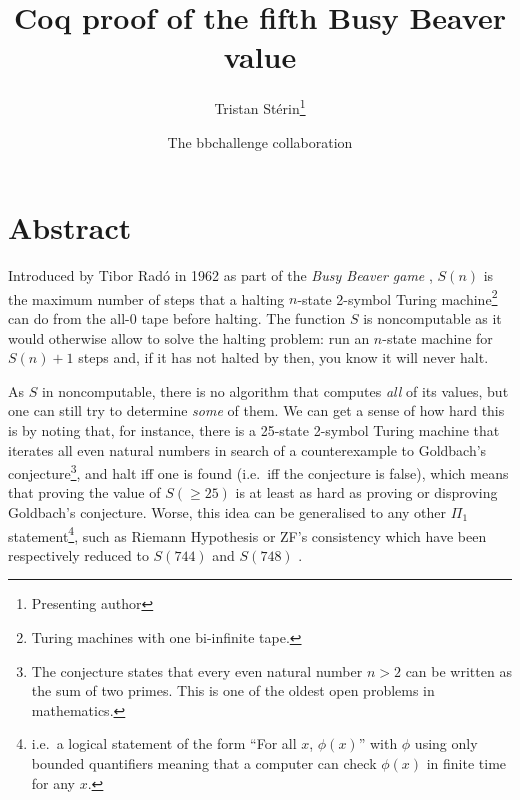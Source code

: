 \documentclass{easychair}
\title{Coq proof of the fifth Busy Beaver value}
\author{
  Tristan Stérin\thanks{Presenting author}\inst{~1,2} \and The bbchallenge collaboration\inst{1}
}
\institute{
  bbchallenge.org,
   \email{bbchallenge@bbchallenge.org}
\and
prgm.dev,
  Paris, France\\
  \email{tristan@prgm.dev}\\
 }
\newcommand{\radofull}{Tibor Rad\'o\xspace}
\theoremstyle{definition} %
\numberwithin{equation}{section}
\theoremstyle{definition} %
\begin{document}
\maketitle

\section*{Abstract}

\newcommand{\ie}{i.e.~}
\newcommand{\eg}{e.g.~}

\newcommand{\noncomput}{noncomputable\xspace}
\newcommand{\BBfull}{Busy Beaver\xspace}
\newcommand{\Coq}{Coq\xspace}
\newcommand{\CoqProofReleaseURL}{\url{https://github.com/ccz181078/Coq-BB5}}


Introduced by \radofull in 1962 as part of the \textit{Busy Beaver game} \cite{Rado_1962}, $S(n)$ is the maximum number of steps that a halting $n$-state 2-symbol Turing machine\footnote{Turing machines with one bi-infinite tape.} can do from the all-0 tape before halting. The function $S$ is noncomputable as it would otherwise allow to solve the 
halting problem: run an $n$-state machine for $S(n)+1$ steps and, if it has not halted by then, you know it will never halt.

As $S$ in noncomputable, there is no algorithm that computes \textit{all} of its values, but one can still try to determine \textit{some} of them. We can get a sense of how hard this is by noting that, for instance, there is a 25-state 2-symbol Turing machine \cite{GoldbachTM27,GoldbachTM25} that iterates all even natural numbers in search of a counterexample to Goldbach's conjecture\footnote{The conjecture states that every even natural number $n>2$ can be written as the sum of two primes. This is one of the oldest open problems in mathematics.}, and halt iff one is found (\ie iff the conjecture is false), which means that proving the value of $S(\geq 25)$ is at least as hard as proving or disproving Goldbach's conjecture. Worse, this idea can be generalised to any other $\Pi_1$ statement\footnote{\ie a logical statement of the form ``For all $x$, $\phi(x)$'' with $\phi$ using only bounded quantifiers meaning that a computer can check $\phi(x)$ in finite time for any $x$.}, such as Riemann Hypothesis or ZF's consistency which have been respectively reduced to $S(744)$ and $S(748)$ \cite{RiemannTM,Yedidia2016,ZFTM,Yedidia2016,BusyBeaverFrontier,BB748Thesis}. 
\end{document}
